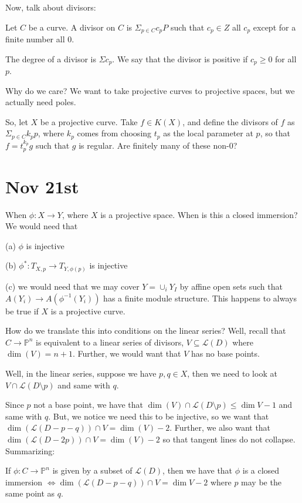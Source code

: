 \documentclass[10pt]{article}
\begin{document}
Now, talk about divisors:

Let $C$ be a curve. A divisor on $C$ is $\Sigma_{p \in C} c_p P$ such that $c_p \in Z$ all $c_p$ except for a finite number all 0.

The degree of a divisor is $\Sigma c_p$. We say that the divisor is positive if $c_p \geq 0$ for all $p$.

Why do we care? We want to take projective curves to projective spaces, but we actually need poles. 

So, let $X$ be a projective curve. Take $f \in K(X)$, and define the divisors of $f$ as $\Sigma_{p \in C} k_p p$, where $k_p$ comes from choosing $t_p$ as the local parameter at $p$, so that $f = t_p^{k_p} g$ such that $g$ is regular. Are finitely many of these non-0?

\section{Nov 21st}

When $\phi: X \to Y$, where $X$ is a projective space. When is this a closed immersion? We would need that 

(a) $\phi$ is injective

(b) $\phi^*: T_{X,p} \to T_{Y,\phi(p)}$ is injective

(c) we would need that we may cover $Y = \cup_i Y_I$ by affine open sets such that $A(Y_i) \to A(\phi^{-1}(Y_i))$ has a finite module structure. This happens to always be true if $X$ is a projective curve.

How do we translate this into conditions on the linear series? Well, recall that $C \to \mathbb{P}^n$ is equivalent to a linear series of divisors, $V \subseteq \mathcal{L}(D)$ where $\dim(V) = n+1$. Further, we would want that $V$ has no base points.

Well, in the linear series, suppose we have $p,q \in X$, then we need to look at $V \cap \mathcal{L}(D \setminus p)$ and same with $q$. 

Since $p$ not a base point, we have that $\dim(V) \cap  \mathcal{L}(D \setminus p) \leq \dim V - 1$ and same with $q$. But, we notice we need this to be injective, so we want that $\dim( \mathcal{L}(D  - p - q)) \cap V = \dim(V) - 2$. Further, we also want that $\dim( \mathcal{L}(D  - 2p)) \cap V = \dim(V) - 2$ so that tangent lines do not collapse. Summarizing:

If $\phi: C \to \mathbb{P}^n$ is given by a subset of $\mathcal{L}(D)$, then we have that $\phi$ is a closed immersion $\iff \dim(\mathcal{L}(D-p-q)) \cap V = \dim V - 2$ where $p$ may be the same point as $q$.
\end{document}
